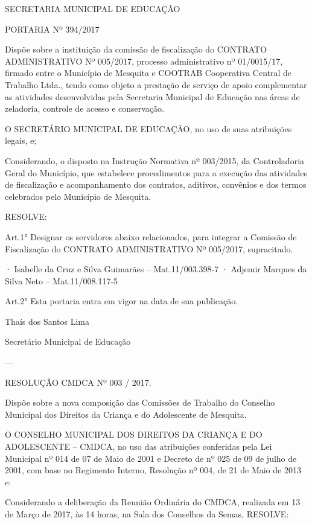 \documentclass{doliberto}
\begin{document}
\thispagestyle{plain}

SECRETARIA MUNICIPAL DE EDUCAÇÃO 
 
PORTARIA Nº 394/2017 

Dispõe  sobre  a  instituição  da  comissão  de  fiscalização  do 
CONTRATO  ADMINISTRATIVO  Nº  005/2017,  processo 
administrativo  nº  01/0015/17, 
firmado  entre  o 
Município de Mesquita e COOTRAB Cooperativa Central 
de  Trabalho  Ltda.,  tendo  como  objeto  a  prestação  de 
serviço de apoio complementar as atividades desenvolvidas 
pela  Secretaria  Municipal  de  Educação  nas  áreas  de 
zeladoria, controle de acesso e conservação. 
 
O  SECRETÁRIO  MUNICIPAL  DE  EDUCAÇÃO,  no  uso  de
suas atribuições legais, e; 
 
Considerando,  o  disposto  na  Instrução  Normativa  nº 
003/2015,  da  Controladoria  Geral  do  Município,  que 
estabelece  procedimentos  para  a  execução  das  atividades 
de  fiscalização  e  acompanhamento  dos  contratos,  aditivos, 
convênios  e  dos  termos  celebrados  pelo  Município  de 
Mesquita. 
 
RESOLVE: 
 
Art.1°  Designar  os  servidores  abaixo  relacionados,  para 
integrar  a  Comissão  de  Fiscalização  do  CONTRATO 
ADMINISTRATIVO Nº 005/2017, supracitado. 
 
· Isabelle da Cruz e Silva Guimarães – Mat.11/003.398-7 
· Adjemir Marques da Silva Neto – Mat.11/008.117-5 
 
Art.2°  Esta  portaria  entra  em  vigor  na  data  de  sua 
publicação. 
 

Thaís dos Santos Lima 

Secretário Municipal de Educação

---

RESOLUÇÃO CMDCA Nº 003 / 2017.  

Dispõe  sobre  a  nova  composição  das  Comissões  de 
Trabalho  do  Conselho  Municipal  dos  Direitos  da 
Criança e do Adolescente de Mesquita.                                        

O  CONSELHO  MUNICIPAL  DOS  DIREITOS  DA  CRIANÇA  E 
DO  ADOLESCENTE  –  CMDCA,  no  uso  das  atribuições 
conferidas pela Lei Municipal nº 014 de 07 de Maio de 2001 
e  Decreto  de  nº  025  de  09  de  julho  de  2001,  com  base  no 
Regimento  Interno,  Resolução  nº  004,  de  21  de  Maio  de 
2013 e:  

Considerando  a  deliberação  da  Reunião  Ordinária  do 
CMDCA, realizada em 13 de Março de 2017, às 14 horas, na 
Sala dos Conselhos da Semas, RESOLVE:   
\end{document}
